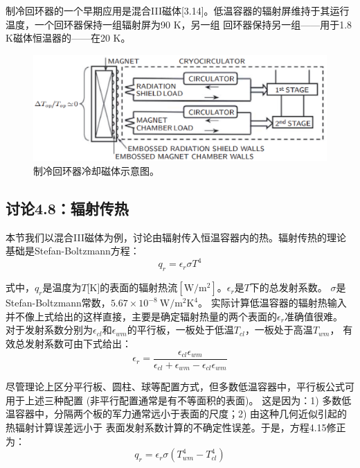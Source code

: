 制冷回环器的一个早期应用是混合III磁体[3.14]。低温容器的辐射屏维持于其运行温度，一个回环器保持一组辐射屏为90 K，另一组
回环器保持另一组——用于1.8 K磁体恒温器的——在20 K。

\begin{figure}[htbp]
	\centering
	\includegraphics[scale=0.5]{chpt4/figs/fig4.15.eps}
	\caption{制冷回环器冷却磁体示意图。}
\end{figure}



\subsection{讨论4.8：辐射传热}
本节我们以混合III磁体为例，讨论由辐射传入恒温容器内的热。辐射传热的理论基础是Stefan-Boltzmann方程：
\begin{equation}%
q_r=\epsilon_r\sigma T^4
\end{equation}

式中，$q_r$是温度为$T$[K]的表面的辐射热流$[\mathrm{W/m^2}]$。$\epsilon_r$是$T$下的总发射系数。
$\sigma$是Stefan-Boltzmann常数，$5.67\times 10^{-8}\ \mathrm{W/m^2 K^4}$。
实际计算低温容器的辐射热输入并不像上式给出的这样直接，主要是确定辐射热量的两个表面的$\epsilon_r$准确值很难。
对于发射系数分别为$\epsilon_{cl}$和$\epsilon_{wm}$的平行板，一板处于低温$T_{cl}$，一板处于高温$T_{wm}$，
有效总发射系数可由下式给出：
\begin{equation}%
\epsilon_r=\frac{\epsilon_{cl}\epsilon_{wm}}{\epsilon_{cl}+\epsilon_{wm}-\epsilon_{cl}\epsilon_{wm}}
\end{equation}

尽管理论上区分平行板、圆柱、球等配置方式，但多数低温容器中，平行板公式可用于上述三种配置
(非平行配置通常是有不等面积的表面)。
这是因为：1) 多数低温容器中，分隔两个板的军力通常远小于表面的尺度；2) 由这种几何近似引起的热辐射计算误差远小于
表面发射系数计算的不确定性误差。于是，方程4.15修正为：
\begin{equation}%
q_r=\epsilon_r\sigma(T_{wm}^4-T_{cl}^4)
\end{equation}

